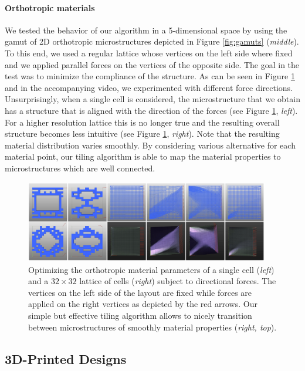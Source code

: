\paragraph{Orthotropic materials}
We tested the behavior of our algorithm in a 5-dimensional space by using the gamut of 2D orthotropic microstructures depicted in Figure \ref{fig:gamuts} (\emph{middle}). To this end, we used a regular lattice whose vertices on the left side where fixed and we applied parallel forces on the vertices of the opposite side. The goal in the test was to minimize the compliance of the structure. As can be seen in Figure \ref{plot:res} and in the accompanying video, we experimented with different force directions. Unsurprisingly, when a single cell is considered, the microstructure that we obtain has a structure that is aligned with the direction of the forces (see Figure \ref{plot:res}, \emph{left}). 
For a higher resolution lattice this is no longer true and the resulting overall structure becomes less intuitive (see Figure \ref{plot:res}, \emph{right}). 
Note that the resulting material distribution varies smoothly. By considering various alternative for each material point, our tiling algorithm is able to map the material properties to microstructures which are well connected. 
\begin{figure}
	\centering
	\includegraphics[width=0.95\textwidth]{images/ortho_square.png}
	\caption{Optimizing the orthotropic material parameters of a single cell (\emph{left}) and a $32\times32$ lattice of cells (\emph{right}) subject to directional forces. The vertices on the left side of the layout are fixed while forces are applied on the right vertices as depicted by the red arrows. Our simple but effective tiling algorithm allows to nicely transition between microstructures of smoothly material properties (\emph{right, top}).}
	\label{plot:res}
\end{figure}
	\subsection{3D-Printed Designs}
	

